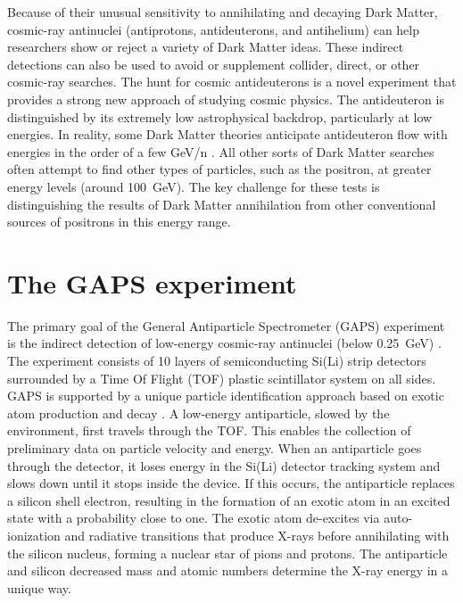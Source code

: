 \noindent
Because of their unusual sensitivity to annihilating and decaying Dark Matter, cosmic-ray antinuclei (antiprotons, antideuterons, and antihelium) can help researchers show or reject a variety of Dark Matter ideas. These indirect detections can also be used to avoid or supplement collider, direct, or other cosmic-ray searches. The hunt for cosmic antideuterons is a novel experiment that provides a strong new approach of studying cosmic physics. The antideuteron is distinguished by its extremely low astrophysical backdrop, particularly at low energies. In reality, some Dark Matter theories anticipate antideuteron flow with energies in the order of a few GeV/n \cite{doetinchem_2020_cosmicray}. All other sorts of Dark Matter searches often attempt to find other types of particles, such as the positron, at greater energy levels (around \SI{100}{\giga\electronvolt}). The key challenge for these tests is distinguishing the results of Dark Matter annihilation from other conventional sources of positrons in this energy range.


\section{The GAPS experiment}
\label{appendixGAPSexperiment}
The primary goal of the General Antiparticle Spectrometer (GAPS) experiment is the indirect detection of low-energy cosmic-ray antinuclei (below \SI{0.25}{\giga\electronvolt}) \cite{doetinchem_2020_cosmicray}. The experiment consists of 10 layers of semiconducting Si(Li) strip detectors surrounded by a Time Of Flight (TOF) plastic scintillator system on all sides. GAPS is supported by a unique particle identification approach based on exotic atom production and decay \cite{re_2022_a}. A low-energy antiparticle, slowed by the environment, first travels through the TOF. This enables the collection of preliminary data on particle velocity and energy. When an antiparticle goes through the detector, it loses energy in the Si(Li) detector tracking system and slows down until it stops inside the device. If this occurs, the antiparticle replaces a silicon shell electron, resulting in the formation of an exotic atom in an excited state with a probability close to one. The exotic atom de-excites via auto-ionization and radiative transitions that produce X-rays before annihilating with the silicon nucleus, forming a nuclear star of pions and protons. The antiparticle and silicon decreased mass and atomic numbers determine the X-ray energy in a unique way.

